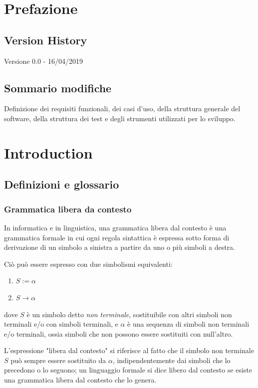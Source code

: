 \documentclass[12pt]{article}
\begin{document}
\tableofcontents

\pagebreak

\section{Prefazione}

\subsection{Version History}

Versione 0.0 - 16/04/2019

\subsection{Sommario modifiche}
Definizione dei requisiti funzionali, dei casi d'uso, della struttura generale del software, della struttura dei test e degli strumenti utilizzati per lo sviluppo.

\pagebreak

\section{Introduction}

\subsection{Definizioni e glossario}
\subsubsection*{Grammatica libera da contesto}
In informatica e in linguistica, una grammatica libera dal contesto è una grammatica formale in cui
ogni regola sintattica è espressa sotto forma di derivazione di un simbolo a sinistra a partire da uno
o più simboli a destra. \par
Ciò può essere espresso con due simbolismi equivalenti:
\begin{enumerate}[label=\arabic*)]
\item $S := \alpha$
\item $S \to \alpha$
\end{enumerate}
dove $S$ è un simbolo detto \textit{non terminale}, sostituibile con altri simboli non terminali e/o con simboli terminali, e $\alpha$ è una sequenza di simboli non terminali e/o terminali, ossia simboli che non possono essere sostituiti con null'altro. \par
L'espressione "libera dal contesto" si riferisce al fatto che il simbolo non terminale $S$ può sempre
essere sostituito da $\alpha$, indipendentemente dai simboli che lo precedono o lo seguono; un linguaggio
formale si dice libero dal contesto se esiste una grammatica libera dal contesto che lo genera.
\end{document}
